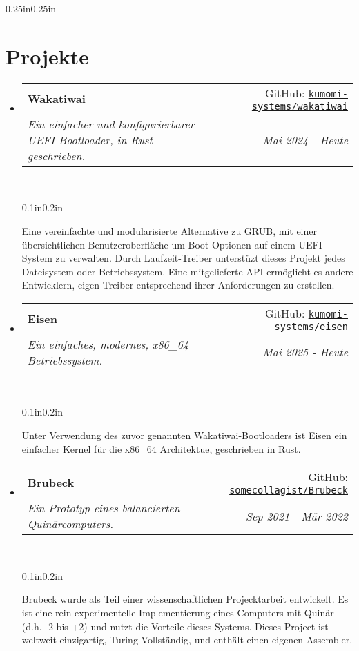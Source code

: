 \documentclass[a4paper]{article}
\makeatletter
\newcommand{\resumeSubheading}[5][]{
  \vspace{2pt}\item
    \begin{tabular*}{0.875\textwidth}[t]{l@{\extracolsep{\fill}}r}
      \textbf{#2} & #3 \\
      \textit{\small#4} & \textit{\small #5} \\
    \end{tabular*}\\
    \vspace{-5pt}
    \begin{adjustwidth}{0.1in}{0.2in}
      #1
    \end{adjustwidth}
    \vspace{10pt}
}
\newcommand{\resumeSubheadingList}[1]{
  \begin{itemize}
    #1
  \end{itemize}
}
\makeatother
\begin{document}
\begin{adjustwidth}{0.25in}{0.25in}
  \section{Projekte}
    \resumeSubheadingList{
      \resumeSubheading[
        Eine vereinfachte und modularisierte Alternative zu GRUB, mit einer
        übersichtlichen Benutzeroberfläche um Boot-Optionen auf einem
        UEFI-System zu verwalten. Durch Laufzeit-Treiber unterstüzt dieses
        Projekt jedes Dateisystem oder Betriebssystem. Eine mitgelieferte
        API ermöglicht es andere Entwicklern, eigen Treiber entsprechend
        ihrer Anforderungen zu erstellen.
      ]
        {Wakatiwai}
        {GitHub: \href{https://github.com/kumomi-systems/wakatiwai}
          {\texttt{kumomi{-}systems/wakatiwai}}}
        {Ein einfacher und konfigurierbarer UEFI Bootloader, in Rust
          geschrieben.}
        {Mai 2024 {-} Heute}
      \resumeSubheading[
        Unter Verwendung des zuvor genannten Wakatiwai-Bootloaders ist Eisen
        ein einfacher Kernel für die x86\_64 Architektue, geschrieben in Rust.
      ]
        {Eisen}
        {GitHub: \href{https://github.com/kumomi-systems/eisen}
          {\texttt{kumomi{-}systems/eisen}}}
        {Ein einfaches, modernes, x86\_64 Betriebssystem.}
        {Mai 2025 {-} Heute}
      \resumeSubheading[
        Brubeck wurde als Teil einer wissenschaftlichen Projecktarbeit
        entwickelt. Es ist eine rein experimentelle Implementierung eines
        Computers mit Quinär (d.h. {-}2 bis +2) und nutzt die Vorteile dieses
        Systems. Dieses Project ist weltweit einzigartig, Turing-Vollständig,
        und enthält einen eigenen Assembler.
      ]
        {Brubeck}
        {GitHub: \href{https://github.com/somecollagist/Brubeck}
          {\texttt{somecollagist/Brubeck}}}
        {Ein Prototyp eines balancierten Quinärcomputers.}
        {Sep 2021 {-} Mär 2022}
    }


\end{adjustwidth}
\end{document}
